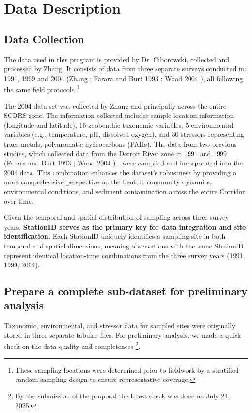 \section{Data Description}

\subsection{Data Collection}

The data used in this program is provided by Dr. Ciborowski, collected and 
processed by Zhang.
It consists of data from
three separate surveys conducted in: 1991, 1999 and 2004 (Zhang \cite{Zhang2008}; Farara and Burt 1993 \cite{Farara1993}; Wood 2004 \cite{Wood2004}),
all following the same field protocols
\footnote{
These sampling locations were determined prior to 
fieldwork by a stratified random sampling design to ensure representative coverage.}.

The 2004 data set was collected by Zhang \cite{Zhang2008} and principally across the entire SCDRS zone.
The information collected includes sample location information (longitude and latitude),
16 zoobenthic taxonomic variables, 5 environmental
variables (e.g., temperature, pH, dissolved oxygen), and 30 stressors representing trace metals,
polyaromatic hydrocarbons (PAHs).
The data from two previous studies, which collected data from the Detroit River zone in 1991 and 1999
(Farara and Burt 1993 \cite{Farara1993}; Wood 2004 \cite{Wood2004})—were compiled and incorporated into the 2004 data.
This combination enhances the dataset's robustness by providing a more comprehensive perspective on
the benthic community dynamics, environmental conditions, and sediment contamination across the entire Corridor over time.


Given the temporal and spatial distribution of sampling across three survey years,
\textbf{StationID serves as the primary key for data integration and site identification.}
{Each StationID uniquely identifies a sampling site in both temporal and spatial dimensions, 
meaning observations with the same StationID represent identical location-time combinations 
from the three survey years (1991, 1999, 2004).}

\subsection{Prepare a complete sub-dataset for preliminary analysis}

Taxonomic, environmental, and stressor data for sampled sites were originally stored in three separate tabular files.
For preliminary analysis, we made a quick check on the data quality and completeness
\footnote{By the submission 
of the proposal the latest check was done on July 24, 2025.}.

